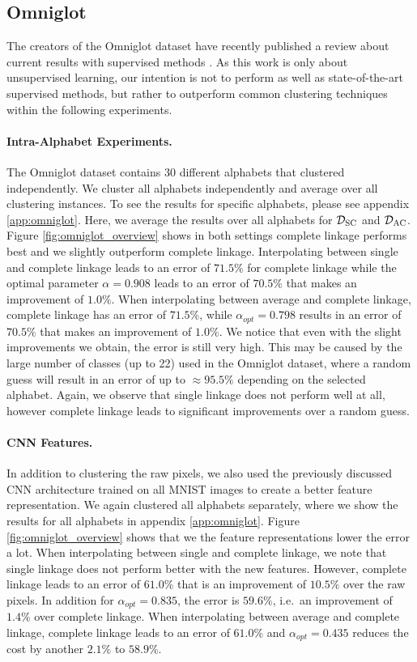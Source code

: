 \subsection{Omniglot}

The creators of the Omniglot dataset have recently published a review about current results with supervised methods \cite{DBLP:journals/corr/abs-1902-03477}. As this work is only about unsupervised learning, our intention is not to perform as well as state-of-the-art supervised methods, but rather to outperform common clustering techniques within the following experiments.

\paragraph{Intra-Alphabet Experiments.} The Omniglot dataset contains 30 different alphabets that clustered independently. We cluster all alphabets independently and average over all clustering instances. To see the results for specific alphabets, please see appendix \ref{app:omniglot}. Here, we average the results over all alphabets for $\mathcal{D}_\text{SC}$ and $\mathcal{D}_\text{AC}$. Figure \ref{fig:omniglot_overview} shows in both settings complete linkage performs best and we slightly outperform complete linkage. Interpolating between single and complete linkage leads to an error of $71.5\%$ for complete linkage while the optimal parameter $\alpha = 0.908$ leads to an error of $70.5\%$ that makes an improvement of $1.0\%$. When interpolating between average and complete linkage, complete linkage has an error of $71.5\%$, while $\alpha_{opt} = 0.798$ results in an error of $70.5\%$ that makes an improvement of $1.0\%$. We notice that even with the slight improvements we obtain, the error is still very high. This may be caused by the large number of classes (up to 22) used in the Omniglot dataset, where a random guess will result in an error of up to $\approx 95.5\%$ depending on the selected alphabet. Again, we observe that single linkage does not perform well at all, however complete linkage leads to significant improvements over a random guess.

\paragraph{CNN Features.} In addition to clustering the raw pixels, we also used the previously discussed CNN architecture trained on all MNIST images to create a better feature representation. We again clustered all alphabets separately, where we show the results for all alphabets in appendix \ref{app:omniglot}. Figure \ref{fig:omniglot_overview} shows that we the feature representations lower the error a lot. When interpolating between single and complete linkage, we note that single linkage does not perform better with the new features. However, complete linkage leads to an error of $61.0\%$ that is an improvement of $10.5\%$ over the raw pixels. In addition for $\alpha_{opt} = 0.835$, the error is $59.6\%$, i.e.\ an improvement of $1.4\%$ over complete linkage. When interpolating between average and complete linkage, complete linkage leads to an error of $61.0\%$ and $\alpha_{opt} = 0.435$ reduces the cost by another $2.1\%$ to $58.9\%$.

